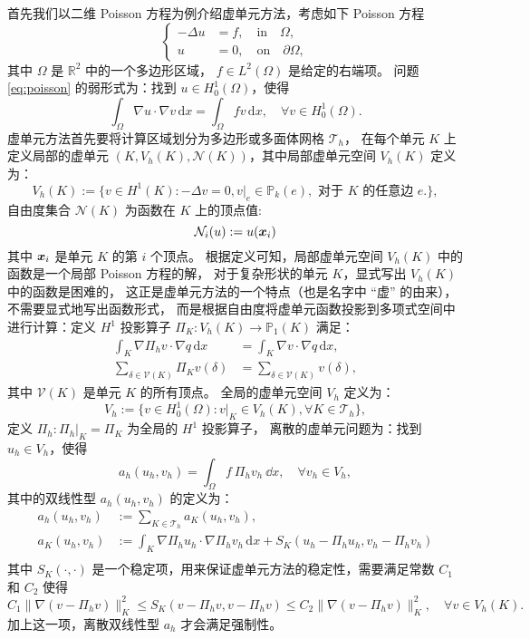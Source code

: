 首先我们以二维 Poisson 方程为例介绍虚单元方法，考虑如下 Poisson 方程
\begin{equation}
\label{eq:poisson}
\left\{
\begin{aligned}
- \Delta u &= f, \quad \text{in} \quad \Omega, \\
u &= 0, \quad \text{on} \quad \partial \Omega,
\end{aligned}
\right.
\end{equation}
其中 $\Omega$ 是 $\mathbb{R}^2$ 中的一个多边形区域，
$f \in L^2(\Omega)$ 是给定的右端项。
问题 \eqref{eq:poisson} 的弱形式为：找到 $u \in H^1_0(\Omega)$，使得
\begin{equation}
\int_{\Omega} \nabla u \cdot \nabla v \, \mathrm{d} x = \int_{\Omega} f v \,
\mathrm{d} x, \quad \forall v \in H^1_0(\Omega).
\end{equation}
虚单元方法首先要将计算区域划分为多边形或多面体网格 $\mathcal{T}_h$，
在每个单元 $K$ 上定义局部的虚单元
$(K, V_h(K), \mathcal{N}(K))$，其中局部虚单元空间 $V_h(K)$ 定义为：
$$
V_h(K) := \{v \in H^1(K) : -\Delta v = 0, v|_e \in \mathbb{P}_k(e),
\text{ 对于 $K$ 的任意边 } e.\},
$$
自由度集合 $\mathcal{N}(K)$ 为函数在 $K$ 上的顶点值:
$$
\mathcal{N}_i(u) := u(\boldsymbol{x}_i)
$$
其中 $\boldsymbol{x}_i$ 是单元 $K$ 的第 $i$ 个顶点。
根据定义可知，局部虚单元空间 $V_h(K)$ 中的函数是一个局部 Poisson 方程的解，
对于复杂形状的单元 $K$，显式写出 $V_h(K)$
中的函数是困难的，
这正是虚单元方法的一个特点（也是名字中 “虚” 的由来），不需要显式地写出函数形式，
而是根据自由度将虚单元函数投影到多项式空间中进行计算：定义 $H^1$ 投影算子
$\Pi_K : V_h(K) \to \mathbb{P}_1(K)$ 满足：
$$
\begin{aligned}
\int_K \nabla \Pi_h v \cdot \nabla q \, \mathrm{d} x & = \int_K \nabla v \cdot
\nabla q \, \mathrm{d} x,\\
\sum_{\delta \in \mathcal{V}(K)} \Pi_K v(\delta) & = \sum_{\delta \in
\mathcal{V}(K)} v(\delta),
\end{aligned}
$$
其中 $\mathcal{V}(K)$ 是单元 $K$ 的所有顶点。
全局的虚单元空间 $V_h$ 定义为：
$$
V_h := \{v \in H^1_0(\Omega) : v|_K \in V_h(K), \forall K \in \mathcal{T}_h\},
$$
定义 $\Pi_h : \Pi_h|_K = \Pi_K$ 为全局的 $H^1$ 投影算子，
离散的虚单元问题为：找到 $u_h \in V_h$，使得
$$
a_h(u_h, v_h) = \int_{\Omega} f\ \Pi_hv_h\ \dd x, \quad \forall v_h \in V_h,
$$
其中的双线性型 $a_h(u_h, v_h)$ 的定义为：
$$
\begin{aligned}
    a_h(u_h, v_h) & := \sum_{K \in \mathcal{T}_h} a_K(u_h, v_h),\\ 
    a_K(u_h, v_h) & := \int_K \nabla \Pi_h u_h \cdot \nabla \Pi_h v_h \, \mathrm{d} x 
    + S_K(u_h - \Pi_h u_h, v_h - \Pi_h v_h)\\
\end{aligned}
$$
其中 $S_K(\cdot, \cdot)$
是一个稳定项，用来保证虚单元方法的稳定性，需要满足常数 $C_1$ 和 $C_2$ 使得
$$
C_1\|\nabla (v - \Pi_h v)\|_K^2 \leq S_K(v - \Pi_h v, v - \Pi_h v)
\leq C_2\|\nabla (v - \Pi_h v)\|_K^2,\quad \forall v \in V_h(K).
$$
加上这一项，离散双线性型 $a_h$ 才会满足强制性。

